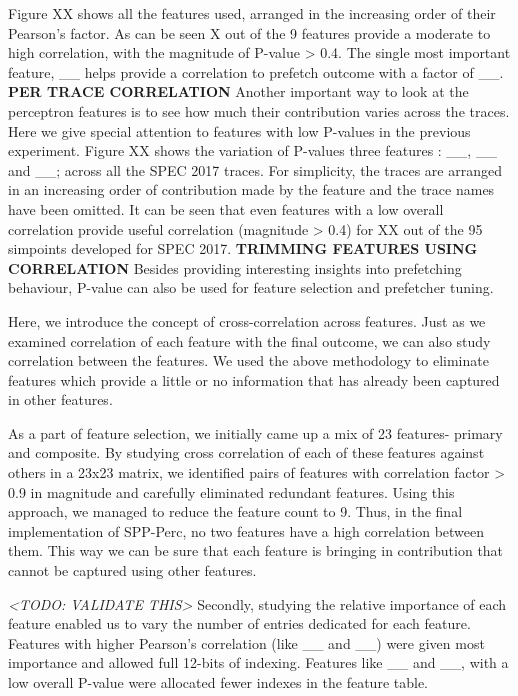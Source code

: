 \documentclass{sig-alternate}
\begin{document}
Figure XX shows all the features used, arranged in the increasing order of their Pearson's factor.
As can be seen X out of the 9 features provide a moderate to high correlation, with the magnitude of P-value > 0.4.
The single most important feature, \_\_ helps provide a correlation to prefetch outcome with a factor of \_\_.
\newline \newline
\textbf{PER TRACE CORRELATION} \newline
Another important way to look at the perceptron features is to see how much their contribution varies across the traces.
Here we give special attention to features with low P-values in the previous experiment.
Figure XX shows the variation of P-values three features : \_\_, \_\_ and \_\_; across all the SPEC 2017 traces.
For simplicity, the traces are arranged in an increasing order of contribution made by the feature and the trace names have been omitted.
It can be seen that even features with a low overall correlation provide useful correlation (magnitude > 0.4) for XX out of the 95 simpoints developed for SPEC 2017.
\newline \newline
\textbf{TRIMMING FEATURES USING CORRELATION} \newline
Besides providing interesting insights into prefetching behaviour, P-value can also be used for feature selection and prefetcher tuning.

Here, we introduce the concept of cross-correlation across features.
Just as we examined correlation of each feature with the final outcome, we can also study correlation between the features.
We used the above methodology to eliminate features which provide a little or no information that has already been captured in other features.

As a part of feature selection, we initially came up a mix of 23 features- primary and composite.
By studying cross correlation of each of these features against others in a 23x23 matrix, we identified pairs of features with correlation factor > 0.9 in magnitude and carefully eliminated redundant features.
Using this approach, we managed to reduce the feature count to 9.
Thus, in the final implementation of SPP-Perc, no two features have a high correlation between them.
This way we can be sure that each feature is bringing in contribution that cannot be captured using other features.

\textit{<TODO: VALIDATE THIS>} 
Secondly, studying the relative importance of each feature enabled us to vary the number of entries dedicated for each feature.
Features with higher Pearson's correlation (like \_\_ and \_\_) were given most importance and allowed full 12-bits of indexing.
Features like \_\_ and \_\_, with a low overall P-value were allocated fewer indexes in the feature table.
\end{document}
